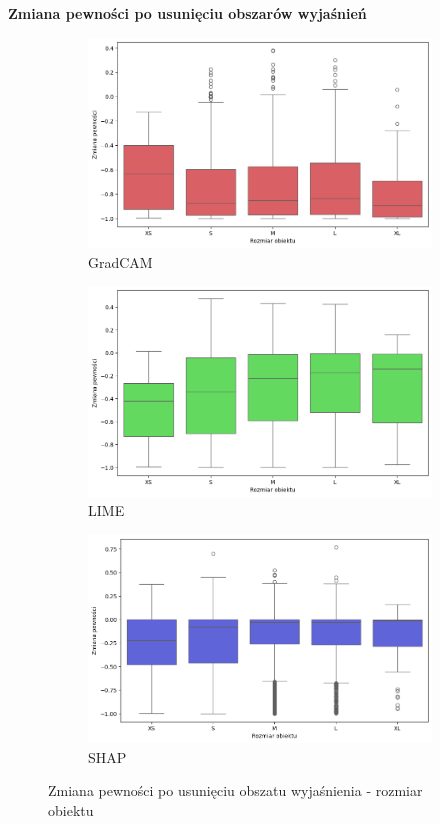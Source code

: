 \textbf{Zmiana pewności po usunięciu obszarów wyjaśnień}
\begin{figure}[h]
	\centering
	\begin{subfigure}[b]{0.3\textwidth}
		\centering\includegraphics[width=.9\textwidth]{img/size_confidence_no_exp_gradcam}
		\caption{GradCAM}  \label{rys:size_confidence_no_exp_gradcam}
	\end{subfigure}
	\begin{subfigure}[b]{0.3\textwidth}
		\centering\includegraphics[width=.9\textwidth]{img/size_confidence_no_exp_lime}
		\caption{LIME}  \label{rys:size_confidence_no_exp_lime}
	\end{subfigure}
	\begin{subfigure}[b]{0.3\textwidth}
		\centering\includegraphics[width=.9\textwidth]{img/size_confidence_no_exp_shap}
		\caption{SHAP}  \label{rys:size_confidence_no_exp_shap}
	\end{subfigure}
	\caption{Zmiana pewności po usunięciu obszatu wyjaśnienia - rozmiar obiektu}
\end{figure}

